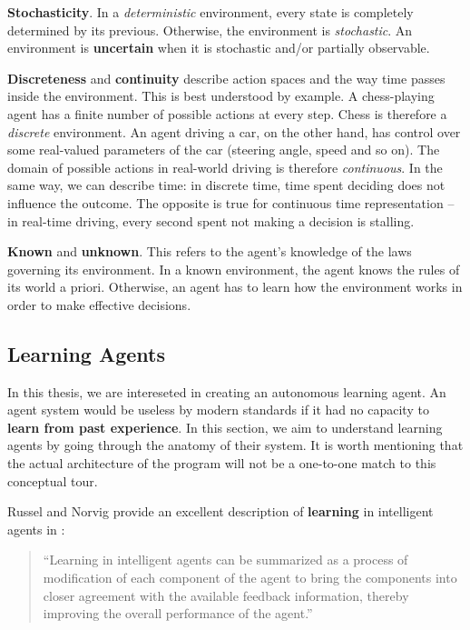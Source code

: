 \textbf{Stochasticity}.
In a \emph{deterministic} environment, every state is completely determined by its previous. Otherwise, the environment is \emph{stochastic}. An environment is \textbf{uncertain} when it is stochastic and/or partially observable.

\textbf{Discreteness} and \textbf{continuity} describe action spaces and the way time passes inside the environment.
This is best understood by example.
A chess-playing agent has a finite number of possible actions at every step.
Chess is therefore a \emph{discrete} environment.
An agent driving a car, on the other hand, has control over some real-valued parameters of the car (steering angle, speed and so on).
The domain of possible actions in real-world driving is therefore \emph{continuous}.
In the same way, we can describe time: in discrete time, time spent deciding does not influence the outcome. The opposite is true for continuous time representation -- in real-time driving, every second spent not making a decision is stalling.

\textbf{Known} and \textbf{unknown}.
This refers to the agent's knowledge of the laws governing its environment. In a known environment, the agent knows the rules of its world a priori. Otherwise, an agent has to learn how the environment works in order to make effective decisions.


\subsection{Learning Agents} \label{learning-agents}
In this thesis, we are intereseted in creating an autonomous learning agent.
An agent system would be useless by modern standards if it had no capacity to \textbf{learn from past experience}.
In this section, we aim to understand learning agents by going through the anatomy of their system.
It is worth mentioning that the actual architecture of the program will not be a one-to-one match to this conceptual tour.

Russel and Norvig provide an excellent description of \textbf{learning} in intelligent agents in \cite{aima}:
\begin{quote}
    ``Learning in intelligent agents can be summarized as a process of modification of each component of the agent to bring the components into closer agreement with the available feedback information, thereby improving the overall performance of the agent.''
\end{quote}

